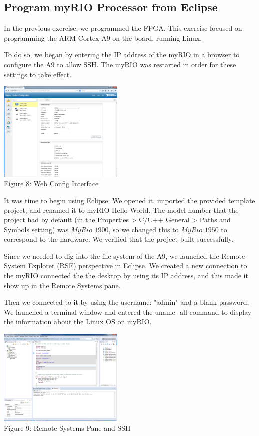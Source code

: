 \documentclass[twoside]{article}
\begin{document}
\begin{multicols}{2}

\section{Program myRIO Processor from Eclipse}

In the previous exercise, we programmed the FPGA. This exercise focused on programming the ARM Cortex-A9 on the board, running Linux. 

To do so, we began by entering the IP address of the myRIO in a browser to configure the A9 to allow SSH. The myRIO was restarted in order for these settings to take effect.

\begin{center}
\includegraphics*[width = 6cm]{Fig8.png}\\
Figure 8: Web Config Interface
\end{center}


\noindent It was time to begin using Eclipse. We opened it, imported the provided template project, and renamed it to myRIO Hello World. The model number that the project had by default (in the Properties > C/C++ General > Paths and Symbols setting) was $MyRio\_1900$, so we changed this to $MyRio\_1950$ to correspond to the hardware. We verified that the project built successfully.

Since we needed to dig into the file system of the A9, we launched the Remote System Explorer (RSE) perspective in Eclipse. We created a new connection to the myRIO connected the the desktop by using its IP address, and this made it show up in the Remote Systems pane.

Then we connected to it by using the username: "admin" and a blank password. We launched a terminal window and entered the uname -all command to display the information about the Linux OS on myRIO.

\begin{center}
\includegraphics*[width = 6cm]{Fig9.png}\\
Figure 9: Remote Systems Pane and SSH
\end{center}


\end{multicols}
\end{document}
